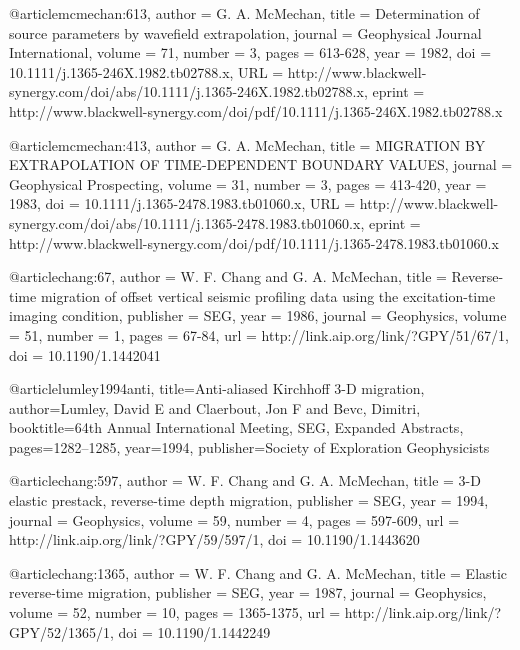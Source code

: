 @article{mcmechan:613,
  author =	 {G. A. McMechan},
  title =	 {Determination of source parameters by wavefield
                  extrapolation},
  journal =	 {Geophysical Journal International},
  volume =	 71,
  number =	 3,
  pages =	 {613-628},
  year =	 1982,
  doi =		 {10.1111/j.1365-246X.1982.tb02788.x},
  URL =
                  {http://www.blackwell-synergy.com/doi/abs/10.1111/j.1365-246X.1982.tb02788.x},
  eprint =
                  {http://www.blackwell-synergy.com/doi/pdf/10.1111/j.1365-246X.1982.tb02788.x}
}

@article{mcmechan:413,
  author =	 {G. A. McMechan},
  title =	 {MIGRATION BY EXTRAPOLATION OF TIME-DEPENDENT
                  BOUNDARY VALUES},
  journal =	 {Geophysical Prospecting},
  volume =	 31,
  number =	 3,
  pages =	 {413-420},
  year =	 1983,
  doi =		 {10.1111/j.1365-2478.1983.tb01060.x},
  URL =
                  {http://www.blackwell-synergy.com/doi/abs/10.1111/j.1365-2478.1983.tb01060.x},
  eprint =
                  {http://www.blackwell-synergy.com/doi/pdf/10.1111/j.1365-2478.1983.tb01060.x}
}

@article{chang:67,
  author =	 {W. F. Chang and G. A. McMechan},
  title =	 {Reverse-time migration of offset vertical seismic
                  profiling data using the excitation-time imaging
                  condition},
  publisher =	 {SEG},
  year =	 1986,
  journal =	 {Geophysics},
  volume =	 51,
  number =	 1,
  pages =	 {67-84},
  url =		 {http://link.aip.org/link/?GPY/51/67/1},
  doi =		 {10.1190/1.1442041}
}

@article{lumley1994anti,
  title={Anti-aliased {K}irchhoff 3-{D} migration},
  author={Lumley, David E and Claerbout, Jon F and Bevc, Dimitri},
  booktitle={64th Annual International Meeting, SEG, Expanded Abstracts},
  pages={1282--1285},
  year={1994},
  publisher={Society of Exploration Geophysicists}
}


@article{chang:597,
  author =	 {W. F. Chang and G. A. McMechan},
  title =	 {3-{D} elastic prestack, reverse-time depth
                  migration},
  publisher =	 {SEG},
  year =	 1994,
  journal =	 {Geophysics},
  volume =	 59,
  number =	 4,
  pages =	 {597-609},
  url =		 {http://link.aip.org/link/?GPY/59/597/1},
  doi =		 {10.1190/1.1443620}
}

@article{chang:1365,
  author =	 {W. F. Chang and G. A. McMechan},
  title =	 {Elastic reverse-time migration},
  publisher =	 {SEG},
  year =	 1987,
  journal =	 {Geophysics},
  volume =	 52,
  number =	 10,
  pages =	 {1365-1375},
  url =		 {http://link.aip.org/link/?GPY/52/1365/1},
  doi =		 {10.1190/1.1442249}
}

